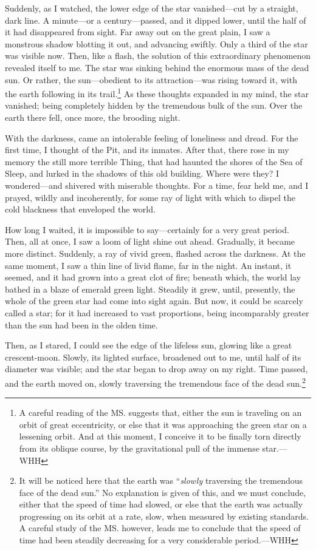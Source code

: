 Suddenly, as I watched, the lower edge of the star vanished---cut by a straight, dark line. A minute---or a century---passed, and it dipped lower, until the half of it had disappeared from sight. Far away out on the great plain, I saw a monstrous shadow blotting it out, and advancing swiftly. Only a third of the star was visible now. Then, like a flash, the solution of this extraordinary phenomenon revealed itself to me. The star was sinking behind the enormous mass of the dead sun. Or rather, the sun---obedient to its attraction---was rising toward it, with the earth following in its trail.\footnote{A careful reading of the MS. suggests that, either the sun is traveling on an orbit of great eccentricity, or else that it was approaching the green star on a lessening orbit. And at this moment, I conceive it to be finally torn directly from its oblique course, by the gravitational pull of the immense star.---WHH} As these thoughts expanded in my mind, the star vanished; being completely hidden by the tremendous bulk of the sun. Over the earth there fell, once more, the brooding night.

With the darkness, came an intolerable feeling of loneliness and dread. For the first time, I thought of the Pit, and its inmates. After that, there rose in my memory the still more terrible Thing, that had haunted the shores of the Sea of Sleep, and lurked in the shadows of this old building. Where were they? I wondered---and shivered with miserable thoughts. For a time, fear held me, and I prayed, wildly and incoherently, for some ray of light with which to dispel the cold blackness that enveloped the world.

How long I waited, it is impossible to say---certainly for a very great period. Then, all at once, I saw a loom of light shine out ahead. Gradually, it became more distinct. Suddenly, a ray of vivid green, flashed across the darkness. At the same moment, I saw a thin line of livid flame, far in the night. An instant, it seemed, and it had grown into a great clot of fire; beneath which, the world lay bathed in a blaze of emerald green light. Steadily it grew, until, presently, the whole of the green star had come into sight again. But now, it could be scarcely called a star; for it had increased to vast proportions, being incomparably greater than the sun had been in the olden time.

Then, as I stared, I could see the edge of the lifeless sun, glowing like a great crescent-moon. Slowly, its lighted surface, broadened out to me, until half of its diameter was visible; and the star began to drop away on my right. Time passed, and the earth moved on, slowly traversing the tremendous face of the dead sun.\footnote{It will be noticed here that the earth was “\textit{slowly} traversing the tremendous face of the dead sun.” No explanation is given of this, and we must conclude, either that the speed of time had slowed, or else that the earth was actually progressing on its orbit at a rate, slow, when measured by existing standards. A careful study of the MS. however, leads me to conclude that the speed of time had been steadily decreasing for a very considerable period.---WHH}

